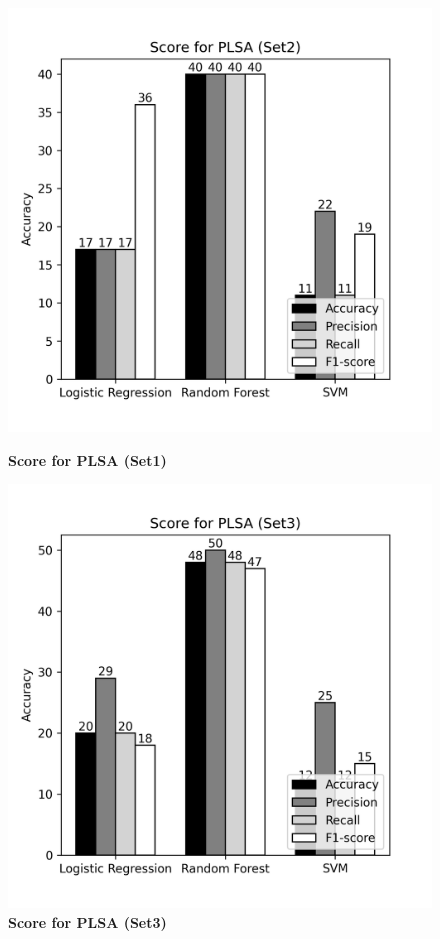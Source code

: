 \documentclass[12pt]{report}
\begin{document}
             \begin{figure}[!htb]
                \begin{minipage}{0.48\textwidth}
                  \centering
                  \includegraphics[scale=0.55]{plots/Score for PLSA (Set2).png}
                  \caption{\textbf{Score for PLSA (Set1)}}\label{Fig:typo1}
                \end{minipage}\hfill
                \begin{minipage}{0.48\textwidth}
                  \centering
                  \includegraphics[scale=0.55]{plots/Score for PLSA (Set3).png}
                  \caption{\textbf{Score for PLSA (Set3)}}\label{Fig:typo2}
                \end{minipage}
             \end{figure}
\end{document}
